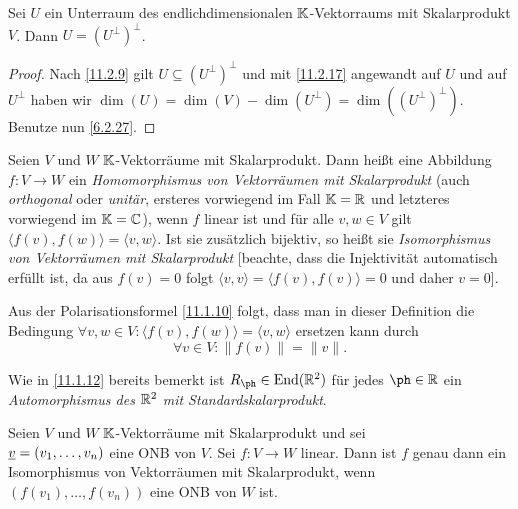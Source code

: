 \documentclass[../../main.tex]{subfiles}
\begin{document}
\begin{kor}\label{11.2.18}
Sei $U$ ein Unterraum des endlichdimensionalen $\mathbb K$-Vektorraums mit Skalarprodukt $V$. Dann $U=(U^\perp)^\perp$.
\end{kor}

\begin{proof}
Nach \ref{11.2.9} gilt $U\subseteq(U^\perp)^\perp$ und mit \ref{11.2.17} angewandt auf $U$ und auf $U^\perp$
haben wir $\dim(U)=\dim(V)-\dim(U^\perp)=\dim((U^\perp)^\perp)$. Benutze nun \ref{6.2.27}.
\end{proof}

\begin{df}\label{11.2.19}
Seien $V$ und $W$ $\mathbb K$-Vektorräume mit Skalarprodukt. Dann heißt eine Abbildung $f\colon V\to W$ ein \emph{Homomorphismus von Vektorräumen mit Skalarprodukt}
(auch \emph{orthogonal} oder \emph{unitär}, ersteres vorwiegend im Fall $\mathbb K=\mathbb R$ und letzteres vorwiegend im $\mathbb K=\mathbb C$), wenn $f$ linear ist und für alle $v,w\in V$ gilt
$\langle f(v),f(w)\rangle=\langle v,w\rangle$. Ist sie zusätzlich bijektiv, so heißt sie \emph{Isomorphismus von Vektorräumen mit Skalarprodukt}
[beachte, dass die Injektivität automatisch erfüllt ist, da aus $f(v)=0$ folgt $\langle v,v\rangle=\langle f(v),f(v)\rangle=0$ und daher $v=0$].
\end{df}

\begin{bem}\label{11.2.20}
Aus der Polarisationsformel \ref{11.1.10} folgt, dass man in dieser Definition die Bedingung $\forall v,w\in V:\langle f(v),f(w)\rangle=\langle v,w\rangle$ ersetzen kann durch
\[\forall v\in V:\|f(v)\|=\|v\|.\]
\end{bem}

\begin{bsp}\label{11.2.21}
Wie in \ref{11.1.12}  bereits bemerkt ist $R_\ph\in\End(\R^2)$ für jedes $\ph\in\R$ ein \emph{Automorphismus des $\mathbb R^2$ mit Standardskalarprodukt}.
\end{bsp}

\begin{sat}\label{11.2.22}
Seien $V$ und $W$ $\mathbb K$-Vektorräume mit Skalarprodukt und sei\\
${\underline v}=(v_1,\dots,v_n)$ eine ONB von $V$. Sei $f\colon V\to W$ linear. Dann ist $f$ genau dann ein
Isomorphismus von Vektorräumen mit Skalarprodukt, wenn $(f(v_1),\dots,f(v_n))$ eine ONB von $W$ ist.
\end{sat}
\end{document}
